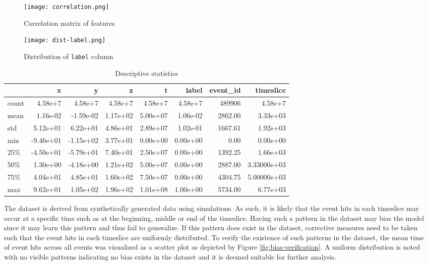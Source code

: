 \begin{figure}[htb]
  \begin{minipage}[t]{0.64\textwidth}
  \centering
  \texttt{[image: correlation.png]}
  \caption{Correlation matrix of features}
  \label{fig:corr}    
  \end{minipage}
  \begin{minipage}[t]{0.34\textwidth}
  \centering
  \texttt{[image: dist-label.png]}
  \caption{Distribution of \texttt{label} column}%
  \label{fig:dist-label}    
  \end{minipage}
\end{figure}

\begin{table}[htb]
  \centering
  \caption{Descriptive statistics}
  \label{tab:desc-stats}
  \begin{tabular}{lrrrrrrr}
    \hline
          & x & y & z & t & label & event\_id & timeslice \\
    \hline
    count & 4.58e+7 &  4.58e+7 &  4.58e+7 &  4.58e+7 &  4.58e+7 &  489906 &  4.58e+7 \\
    mean  & 1.16e-02 & -1.59e-02 &  1.17e+02 &  5.00e+07 &  1.06e-02 &    2862.00 &  3.33e+03 \\
    std   & 5.12e+01 &  6.22e+01 &  4.86e+01 &  2.89e+07 &  1.02e-01 &    1667.61 &  1.92e+03 \\
    min   & -9.46e+01 & -1.15e+02 &  3.77e+01 &  0.00e+00 &  0.00e+00 &       0.00 &  0.00e+00 \\
    25\%  & -4.50e+01 & -5.79e+01 &  7.40e+01 &  2.50e+07 &  0.00e+00 &    1392.25 &  1.66e+03 \\
    50\%  & 1.30e+00 & -4.18e+00 &  1.21e+02 &  5.00e+07 &  0.00e+00 &    2887.00 &  3.33000e+03 \\
    75\%  & 4.04e+01 &  4.85e+01 &  1.60e+02 &  7.50e+07 &  0.00e+00 &    4304.75 &  5.00000e+03 \\
    max  & 9.62e+01 &  1.05e+02 &  1.96e+02 &  1.01e+08 &  1.00e+00 &    5734.00 &  6.77e+03 \\
    \hline
  \end{tabular}
\end{table}

The dataset is derived from synthetically generated data using
simulations. As such, it is likely that the event hits in each
timeslice may occur at a specific time such as at the beginning,
middle or end of the timeslice. Having such a pattern in the dataset
may bias the model since it may learn this pattern and thus fail to
generalize. If this pattern does exist in the dataset, corrective
measures need to be taken such that the event hits in each timeslice
are uniformly distributed. To verify the existence of such patterns in
the dataset, the mean time of event hits across all events was
visualized as a scatter plot as depicted by Figure
\ref{fig:bias-verification}. A uniform distribution is noted with no
visible patterns indicating no bias exists in the dataset and it is
deemed suitable for further analysis.

